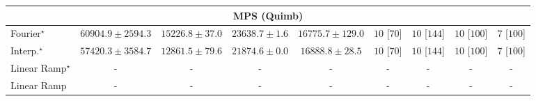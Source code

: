 \begin{tabular}{l|cccc|cccc|}
\cline{1-9}
\multicolumn{9}{c}{\rule{0pt}{8pt}MPS (Quimb)} \\
\midrule
Fourier$^\star$ & {\cellcolor[HTML]{892F05}} \color[HTML]{F1F1F1} $60904.9\pm 2594.3$ & {\cellcolor[HTML]{FFF7BD}} \color[HTML]{000000} $15226.8\pm 37.0$ & {\cellcolor[HTML]{FEDF88}} \color[HTML]{000000} $23638.7\pm 1.6$ & {\cellcolor[HTML]{FFF3B4}} \color[HTML]{000000} $16775.7\pm 129.0$ & {\cellcolor[HTML]{49006A}} \color[HTML]{F1F1F1} $10$ [$70$] & {\cellcolor[HTML]{49006A}} \color[HTML]{F1F1F1} $10$ [$144$] & {\cellcolor[HTML]{49006A}} \color[HTML]{F1F1F1} $10$ [$100$] & {\cellcolor[HTML]{CD238F}} \color[HTML]{F1F1F1} $7$ [$100$] \\
Interp.$^\star$ & {\cellcolor[HTML]{A13804}} \color[HTML]{F1F1F1} $57420.3\pm 3584.7$ & {\cellcolor[HTML]{FFFACA}} \color[HTML]{000000} $12861.5\pm 79.6$ & {\cellcolor[HTML]{FEE595}} \color[HTML]{000000} $21874.6\pm 0.0$ & {\cellcolor[HTML]{FFF3B4}} \color[HTML]{000000} $16888.8\pm 28.5$ & {\cellcolor[HTML]{49006A}} \color[HTML]{F1F1F1} $10$ [$70$] & {\cellcolor[HTML]{49006A}} \color[HTML]{F1F1F1} $10$ [$144$] & {\cellcolor[HTML]{49006A}} \color[HTML]{F1F1F1} $10$ [$100$] & {\cellcolor[HTML]{CD238F}} \color[HTML]{F1F1F1} $7$ [$100$] \\
Linear Ramp$^\star$ & {\cellcolor[HTML]{000000}} \color[HTML]{F1F1F1} {\cellcolor{white}} \color{black} - & {\cellcolor[HTML]{000000}} \color[HTML]{F1F1F1} {\cellcolor{white}} \color{black} - & {\cellcolor[HTML]{000000}} \color[HTML]{F1F1F1} {\cellcolor{white}} \color{black} - & {\cellcolor[HTML]{000000}} \color[HTML]{F1F1F1} {\cellcolor{white}} \color{black} - & {\cellcolor[HTML]{000000}} \color[HTML]{F1F1F1} {\cellcolor{white}} \color{black} - & {\cellcolor[HTML]{000000}} \color[HTML]{F1F1F1} {\cellcolor{white}} \color{black} - & {\cellcolor[HTML]{000000}} \color[HTML]{F1F1F1} {\cellcolor{white}} \color{black} - & {\cellcolor[HTML]{000000}} \color[HTML]{F1F1F1} {\cellcolor{white}} \color{black} - \\
Linear Ramp & {\cellcolor[HTML]{000000}} \color[HTML]{F1F1F1} {\cellcolor{white}} \color{black} - & {\cellcolor[HTML]{000000}} \color[HTML]{F1F1F1} {\cellcolor{white}} \color{black} - & {\cellcolor[HTML]{000000}} \color[HTML]{F1F1F1} {\cellcolor{white}} \color{black} - & {\cellcolor[HTML]{000000}} \color[HTML]{F1F1F1} {\cellcolor{white}} \color{black} - & {\cellcolor[HTML]{000000}} \color[HTML]{F1F1F1} {\cellcolor{white}} \color{black} - & {\cellcolor[HTML]{000000}} \color[HTML]{F1F1F1} {\cellcolor{white}} \color{black} - & {\cellcolor[HTML]{000000}} \color[HTML]{F1F1F1} {\cellcolor{white}} \color{black} - & {\cellcolor[HTML]{000000}} \color[HTML]{F1F1F1} {\cellcolor{white}} \color{black} - \\

\end{tabular}
